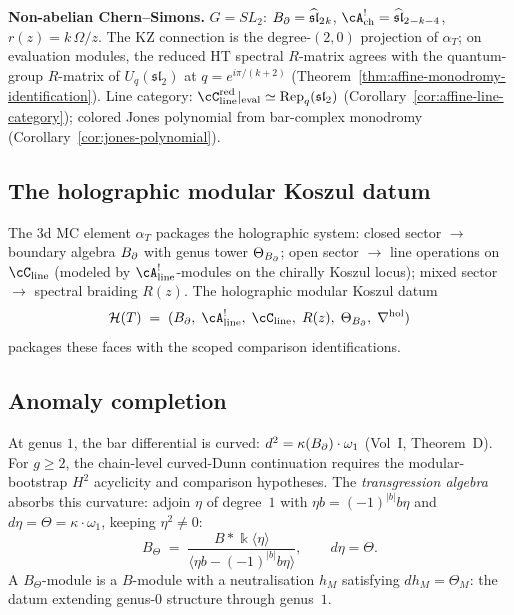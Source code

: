 \medskip
\noindent\textbf{Non-abelian Chern--Simons.}\enspace
$G = SL_2$: $B_{\partial} = \widehat{\mathfrak{sl}}_2{}_k$,
$\cA^!_{\mathrm{ch}} = \widehat{\mathfrak{sl}}_2{}_{-k-4}$,
$r(z) = k\,\Omega/z$. The KZ connection is the degree-$(2,0)$
projection of $\alpha_T$; on evaluation modules, the reduced HT
spectral $R$-matrix agrees with the quantum-group $R$-matrix of
$U_q(\mathfrak{sl}_2)$ at $q = e^{i\pi/(k+2)}$
(Theorem~\ref{thm:affine-monodromy-identification}).
Line category:
$\cC_{\mathrm{line}}^{\mathrm{red}}|_{\mathrm{eval}}
\simeq \operatorname{Rep}_q(\mathfrak{sl}_2)$
(Corollary~\ref{cor:affine-line-category});
colored Jones polynomial from bar-complex monodromy
(Corollary~\ref{cor:jones-polynomial}).

\subsection*{The holographic modular Koszul datum}

The 3d MC element $\alpha_T$ packages the holographic system:
closed sector $\to$ boundary algebra $B_{\partial}$ with genus tower
$\Theta_{B_{\partial}}$; open sector $\to$ line operations on
$\cC_{\mathrm{line}}$ (modeled by
$\cA^!_{\mathrm{line}}$-modules on the chirally Koszul locus);
mixed sector $\to$ spectral braiding $R(z)$. The
holographic modular Koszul datum
\[
\mathcal{H}(T)
\;=\;
(\Bbound,\; \cA^!_{\mathrm{line}},\; \cC_{\mathrm{line}},\; R(z),\;
\Theta_{\Bbound},\; \nabla^{\mathrm{hol}})
\]
packages these faces with the scoped comparison identifications.

\subsection*{Anomaly completion}

At genus $1$, the bar differential is curved:
$d^2 = \kappa(B_{\partial}) \cdot \omega_1$ (Vol~I, Theorem~D).
For $g \ge 2$, the chain-level curved-Dunn continuation requires the
modular-bootstrap $H^2$ acyclicity and comparison hypotheses.
The \emph{transgression algebra} absorbs this curvature: adjoin
$\eta$ of degree~$1$ with
$\eta b = (-1)^{|b|} b \eta$ and
$d\eta = \Theta = \kappa \cdot \omega_1$, keeping $\eta^2 \ne 0$:
\[
B_\Theta
\;=\;
\frac{B * \Bbbk\langle\eta\rangle}
{\langle \eta b - (-1)^{|b|} b\eta \rangle},
\qquad
d\eta = \Theta.
\]
A $B_\Theta$-module is a $B$-module with a neutralisation
$h_M$ satisfying $dh_M = \Theta_M$: the datum extending
genus-$0$ structure through genus~$1$.

